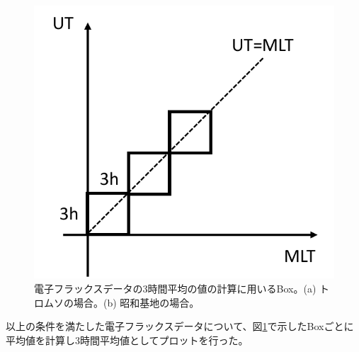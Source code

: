 \begin{enumerate}
\begin{figure}[htbp]
\begin{minipage}{.495\linewidth}
        \end{minipage}
        \begin{minipage}{.495\linewidth}
            \centering
            \includegraphics[scale=0.5]{master_thesis_contents/master_thesis_fig/app_poes_box_syowa.pdf}
        \end{minipage}
        \caption{電子フラックスデータの3時間平均の値の計算に用いるBox。(a) トロムソの場合。(b) 昭和基地の場合。}
        \label{fig:app_poes_box}
    \end{figure}
\end{enumerate} \par
以上の条件を満たした電子フラックスデータについて、図\ref{fig:app_poes_box}で示したBoxごとに平均値を計算し3時間平均値としてプロットを行った。
